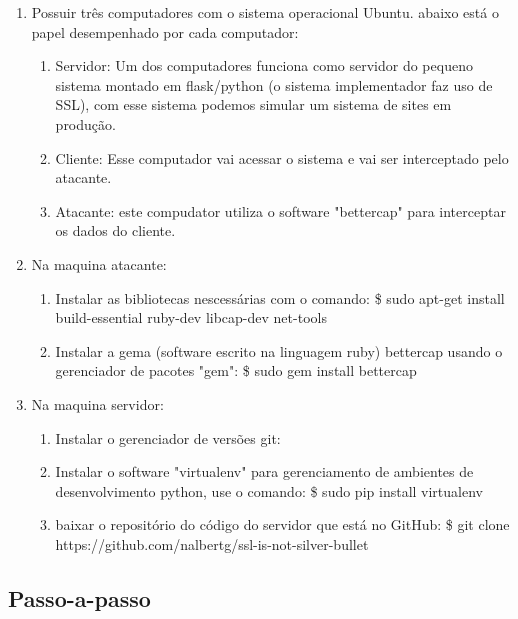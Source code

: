 \documentclass{article}
\begin{document}
    \begin{enumerate}
      \item Possuir três computadores com o  sistema operacional Ubuntu.
      abaixo está o papel desempenhado por cada computador:
      \begin{enumerate}
        \item Servidor: Um dos computadores funciona como servidor do pequeno
        sistema montado em flask/python (o sistema implementador faz uso de
        SSL), com esse sistema podemos simular um sistema de sites em produção.
        \item Cliente: Esse computador vai acessar o sistema e vai ser
        interceptado pelo atacante.
        \item Atacante: este compudator utiliza o software "bettercap" para
        interceptar os dados do cliente.
      \end{enumerate}
      \item Na maquina atacante:
      \begin{enumerate}
        \item Instalar as bibliotecas nescessárias com o comando:
          \$ sudo apt-get install build-essential ruby-dev libcap-dev net-tools
        \item Instalar a gema (software escrito na linguagem ruby) bettercap
          usando o gerenciador de pacotes "gem": \$ sudo gem install bettercap
      \end{enumerate}
      \item Na maquina servidor:
      \begin{enumerate}
        \item Instalar o gerenciador de versões git:
        \item Instalar o software "virtualenv" para gerenciamento de ambientes
        de desenvolvimento python, use o comando: \$ sudo pip install virtualenv
        \item baixar o repositório do código do servidor que está no GitHub:
        \$ git clone https://github.com/nalbertg/ssl-is-not-silver-bullet
      \end{enumerate}
    \end{enumerate}

  \newpage

  \subsection{Passo-a-passo}
\end{document}
